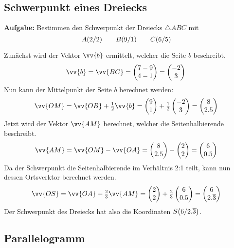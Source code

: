 \subsection{Schwerpunkt eines Dreiecks}
\textbf{Aufgabe:} Bestimmen den Schwerpunkt der Dreiecks $\triangle ABC$ mit
\[
  \pxy[A]{2,2} \qquad \pxy[B]{9,1} \qquad \pxy[C]{6,5}
\]
\begin{center}
\end{center}
Zunächst wird der Vektor $\vv{b}$ ermittelt, welcher die Seite $b$ beschreibt.
\[
  \vv{b} = \vv{BC} = \vxy{7-9,4-1} = \vxy{-2,3} \\
\]
Nun kann der Mittelpunkt der Seite $b$ berechnet werden:
\[
  \vv{OM} = \vv{OB}+\tfrac{1}{2}\vv{b} = \vxy{9,1}+\tfrac{1}{2}\vxy{-2,3} = \vxy{8,2.5}
\]
Jetzt wird der Vektor $\vv{AM}$ berechnet, welcher die Seitenhalbierende beschreibt.
\[
  \vv{AM} = \vv{OM}-\vv{OA} = \vxy{8,2.5}-\vxy{2,2} = \vxy{6,0.5}
\]
Da der Schwerpunkt die Seitenhalbierende im Verhältnis 2:1 teilt, kann nun dessen Ortsverktor berechnet werden.
\[
  \vv{OS} = \vv{OA}+\tfrac{2}{3}\vv{AM} = \vxy{2,2}+\tfrac{2}{3}\vxy{6,0.5} = \vxy{6,2.\overline{3}}
\]
Der Schwerpunkt des Dreiecks hat also die Koordinaten $\pxy[S]{6,2.\overline{3}}$.
\newpage
\subsection{Parallelogramm}

